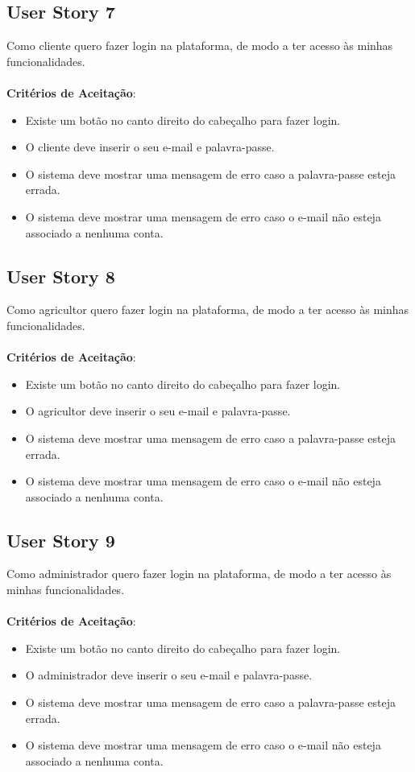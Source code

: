 \documentclass[a4paper,11pt]{article}
\begin{document}
\subsection{User Story 7}
Como cliente quero fazer login na plataforma, de modo a ter acesso às minhas funcionalidades.\\\\
\textbf{Critérios de Aceitação}:
\begin{itemize}
  \item Existe um botão no canto direito do cabeçalho para fazer login.
  \item O cliente deve inserir o seu e-mail e palavra-passe.
  \item O sistema deve mostrar uma mensagem de erro caso a palavra-passe esteja errada.
  \item O sistema deve mostrar uma mensagem de erro caso o e-mail não esteja associado a nenhuma conta.
\end{itemize}
\subsection{User Story 8}
Como agricultor quero fazer login na plataforma, de modo a ter acesso às minhas funcionalidades.\\\\
\textbf{Critérios de Aceitação}:
\begin{itemize}
  \item Existe um botão no canto direito do cabeçalho para fazer login.
  \item O agricultor deve inserir o seu e-mail e palavra-passe.
  \item O sistema deve mostrar uma mensagem de erro caso a palavra-passe esteja errada.
  \item O sistema deve mostrar uma mensagem de erro caso o e-mail não esteja associado a nenhuma conta.
\end{itemize}
\subsection{User Story 9}
Como administrador quero fazer login na plataforma, de modo a ter acesso às minhas funcionalidades.\\\\
\textbf{Critérios de Aceitação}:
\begin{itemize}
  \item Existe um botão no canto direito do cabeçalho para fazer login.
  \item O administrador deve inserir o seu e-mail e palavra-passe.
  \item O sistema deve mostrar uma mensagem de erro caso a palavra-passe esteja errada.
  \item O sistema deve mostrar uma mensagem de erro caso o e-mail não esteja associado a nenhuma conta.
\end{itemize}
\end{document}
